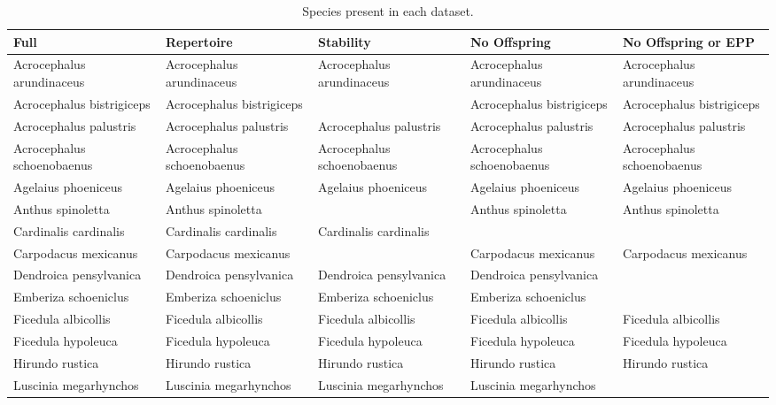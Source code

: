 \documentclass{article}
\begin{document}
  
  
  \begin{sidewaystable}[ph!]
  \caption{Species present in each dataset.}
  
  \centering
  \begin{tabular}{|l|l|l|l|l|}
  \hline
  Full & Repertoire & Stability & No Offspring & No Offspring or EPP \\ 
  \hline
  Acrocephalus arundinaceus & Acrocephalus arundinaceus & Acrocephalus arundinaceus & Acrocephalus arundinaceus & Acrocephalus arundinaceus \\ 
  Acrocephalus bistrigiceps & Acrocephalus bistrigiceps &  & Acrocephalus bistrigiceps & Acrocephalus bistrigiceps \\ 
  Acrocephalus palustris & Acrocephalus palustris & Acrocephalus palustris & Acrocephalus palustris & Acrocephalus palustris \\ 
  Acrocephalus schoenobaenus & Acrocephalus schoenobaenus & Acrocephalus schoenobaenus & Acrocephalus schoenobaenus & Acrocephalus schoenobaenus \\ 
  Agelaius phoeniceus & Agelaius phoeniceus & Agelaius phoeniceus & Agelaius phoeniceus & Agelaius phoeniceus \\ 
  Anthus spinoletta & Anthus spinoletta &  & Anthus spinoletta & Anthus spinoletta \\ 
  Cardinalis cardinalis & Cardinalis cardinalis & Cardinalis cardinalis &  &  \\ 
  Carpodacus mexicanus & Carpodacus mexicanus &  & Carpodacus mexicanus & Carpodacus mexicanus \\ 
  Dendroica pensylvanica & Dendroica pensylvanica & Dendroica pensylvanica & Dendroica pensylvanica &  \\ 
  Emberiza schoeniclus & Emberiza schoeniclus & Emberiza schoeniclus & Emberiza schoeniclus &  \\ 
  Ficedula albicollis & Ficedula albicollis & Ficedula albicollis & Ficedula albicollis & Ficedula albicollis \\ 
  Ficedula hypoleuca & Ficedula hypoleuca & Ficedula hypoleuca & Ficedula hypoleuca & Ficedula hypoleuca \\ 
  Hirundo rustica & Hirundo rustica & Hirundo rustica & Hirundo rustica & Hirundo rustica \\ 
  Luscinia megarhynchos & Luscinia megarhynchos & Luscinia megarhynchos & Luscinia megarhynchos &  \\ 

\end{tabular}
\end{sidewaystable}
\end{document}
